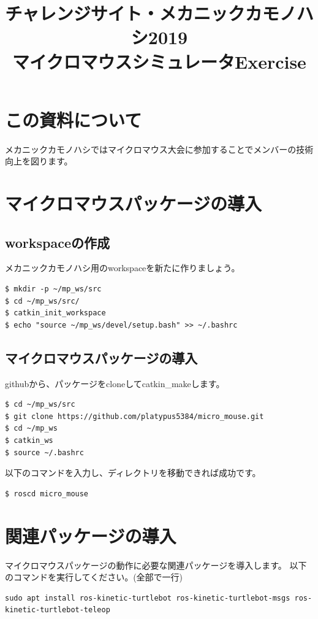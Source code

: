 \documentclass[11pt,a4paper]{jsarticle}
\title{チャレンジサイト・メカニックカモノハシ2019\\マイクロマウスシミュレータExercise}
\begin{document}
\maketitle
%
%
\section{この資料について}
メカニックカモノハシではマイクロマウス大会に参加することでメンバーの技術向上を図ります。


\section{マイクロマウスパッケージの導入}

\subsection{workspaceの作成}
メカニックカモノハシ用のworkspaceを新たに作りましょう。

\begin{lstlisting}[frame=single, caption=workspaceの作成, label=create_workspace]
$ mkdir -p ~/mp_ws/src
$ cd ~/mp_ws/src/
$ catkin_init_workspace
$ echo "source ~/mp_ws/devel/setup.bash" >> ~/.bashrc
\end{lstlisting}


\subsection{マイクロマウスパッケージの導入}
githubから、パッケージをcloneしてcatkin\_makeします。
\begin{lstlisting}[frame=single, caption=catkin\_make, label=catkin_make]
$ cd ~/mp_ws/src
$ git clone https://github.com/platypus5384/micro_mouse.git
$ cd ~/mp_ws
$ catkin_ws
$ source ~/.bashrc
\end{lstlisting}

以下のコマンドを入力し、ディレクトリを移動できれば成功です。
\begin{lstlisting}[frame=single, caption=roscd, label=roscd]
$ roscd micro_mouse
\end{lstlisting}


\newpage

\section{関連パッケージの導入}
マイクロマウスパッケージの動作に必要な関連パッケージを導入します。
以下のコマンドを実行してください。(全部で一行)
\begin{lstlisting}[frame=single, caption=roscd, label=roscd]
sudo apt install ros-kinetic-turtlebot ros-kinetic-turtlebot-msgs ros-kinetic-turtlebot-teleop 
\end{lstlisting}
\end{document}
